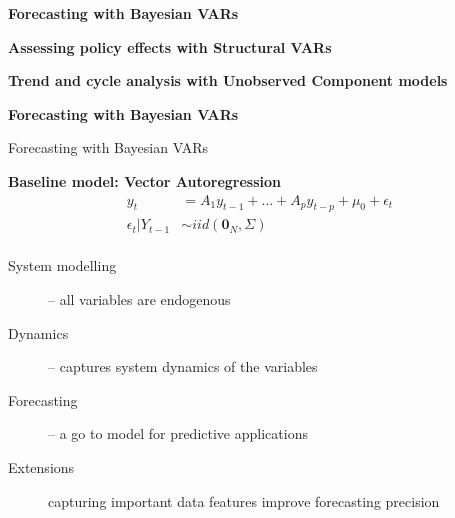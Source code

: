 \documentclass[notes,blackandwhite,mathsans]{beamer}
\begin{document}
{
\begin{frame}


\bigskip\textbf{\color{mcxs3}Forecasting with Bayesian VARs}

\bigskip\textbf{\color{mcxs1}Assessing policy effects with Structural VARs}

\bigskip\textbf{\color{mcxs3}Trend and cycle analysis with Unobserved Component models}

\end{frame}
}














{
\begin{frame}

\begin{adjustwidth}{-0.5cm}{0cm}
\vspace{8.3cm}\Large
\textbf{{\color{mcxs2}Forecasting with} {\color{mcxs1}Bayesian VARs}}
\end{adjustwidth}

\end{frame}
}




\begin{frame}{Forecasting with Bayesian VARs}

\textbf{Baseline model: Vector Autoregression}
\begin{align*}
y_t &= A_1 y_{t-1} + \dots + A_p y_{t-p}  + \mu_0 + \epsilon_t\\[1ex]
\epsilon_t|Y_{t-1} &\sim iid\left(\mathbf{0}_N,\Sigma\right)\\
\end{align*}

\begin{description}
\item[System modelling] {\color{mcxs2}-- all variables are endogenous} 
\item[Dynamics] {\color{mcxs2}-- captures system dynamics of the variables} 
\item[Forecasting] {\color{mcxs2}-- a go to model for predictive applications} 
\item[Extensions] {\color{mcxs2} capturing important data features improve forecasting precision}
\end{description}
\end{frame}
\end{document}

